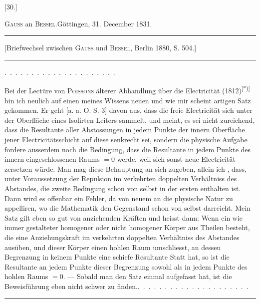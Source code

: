 \clearpage\begingroup{}
\begin{center}[30.]\end{center}
\begin{center}\textsc{Gauss} an \textsc{Bessel}.\quad Göttingen, 31. December 1831.\end{center}
\begin{center}\begin{minipage}{.88\linewidth}\centering\hrule\vspace{3pt}
\small [Briefwechsel zwischen \textsc{Gauss} und \textsc{Bessel}, Berlin 1880, S. 504.]
\par\vspace{3pt}\hrule\end{minipage}\end{center}
\noindent .\ .\ .\ .\ .\ .\ .\ .\ .\ .\ .\ .\ .\ .\ .\ .\ .\ .\ .\ .\ .\par
\indent Bei der Lectüre von \textsc{Poissons} älterer Abhandlung über die Electricität
(1812)\textsuperscript{[*)]} bin ich neulich auf einen meines Wissens neuen und wie mir scheint
artigen Satz gekommen. Er geht [a. a. O. S. 3] davon aus, dass die freie Electricität
sich unter der Oberfläche eines Isolirten Leiters sammelt, und meint, es
sei nicht zureichend, dass die Resultante aller Abstossungen in jedem Punkte
der innern Oberfläche jener Electricitätsschicht auf diese senkrecht sei, sondern
die physische Aufgabe fordere ausserdem noch die Bedingung, dass die Resultante
in jedem Punkte des innern eingeschlossenen Raums \(=0\) werde, weil sich
sonst neue Electricität zersetzen würde. Man mag diese Behauptung an sich
zugeben, allein ich , dass, unter Voraussetzung der Repulsion im
verkehrten doppelten Verhältniss des Abstandes, die zweite Bedingung schon
von selbst in der ersten enthalten ist. Dann wird es offenbar ein Fehler, da
von neuem an die physische Natur zu appelliren, wo die Mathematik den
Gegenstand schon von selbst darreicht. Mein Satz gilt eben so gut von anziehenden
Kräften und heisst dann: Wenn ein wie immer gestalteter homogener
oder nicht homogener Körper aus Theilen besteht, die eine Anziehungskraft
im verkehrten doppelten Verhältniss des Abstandes ausüben, und dieser
Körper einen hohlen Raum umschliesst, an dessen Begrenzung in keinem
Punkte eine schiefe Resultante Statt hat, so ist die Resultante an jedem Punkte
dieser Begrenzung sowohl als in jedem Punkte des hohlen Raums \(=0\). —
Sobald man den Satz einmal aufgefasst hat, ist die Beweisführung eben nicht
schwer zu finden.\quad .\ .\ .\ .\ .\ .\ .\ .\ .\ .\ .\ .\ .\ .\ .\ .\ .\ .\ .\ .\ .
\begingroup\renewcommand{\thefootnote}{}\endgroup
\par\bigskip\begin{center}\rule{.24\linewidth}{.4pt}\end{center}
\clearpage\endgroup
